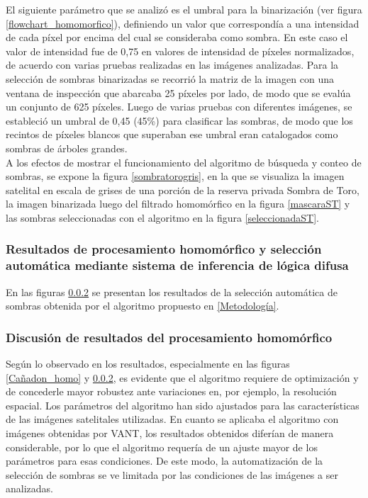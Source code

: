 El siguiente parámetro que se analizó es el umbral para la binarización (ver figura \ref{flowchart_homomorfico}), definiendo un valor que correspondía a una intensidad de cada píxel por encima del cual se consideraba como sombra. En este caso el valor de intensidad fue de 0,75 en valores de intensidad de píxeles normalizados, de acuerdo con varias pruebas realizadas en las imágenes analizadas.
Para la selección de sombras binarizadas se recorrió la matriz de la imagen con una ventana de inspección que abarcaba 25 píxeles por lado, de modo que se evalúa un conjunto de 625 píxeles. Luego de varias pruebas con diferentes imágenes, se estableció un umbral de 0,45 (45\%) para clasificar las sombras, de modo que los recintos de píxeles blancos que superaban ese umbral eran catalogados como sombras de árboles grandes.\\
A los efectos de mostrar el funcionamiento del algoritmo de búsqueda y conteo de sombras, se expone la figura \ref{sombratorogris}, en la que se visualiza la imagen satelital en escala de grises de una porción de la reserva privada Sombra de Toro, la imagen binarizada luego del filtrado homomórfico en la figura \ref{mascaraST} y las sombras seleccionadas con el algoritmo en la figura \ref{seleccionadaST}.


\subsubsection{Resultados de procesamiento homomórfico y selección automática mediante sistema de inferencia de lógica difusa}
En las figuras \ref{} se presentan los resultados de la selección automática de sombras obtenida por el algoritmo propuesto en \ref{Metodología}.

\subsubsection{Discusión de resultados del procesamiento homomórfico}
Según lo observado en los resultados, especialmente en las figuras \ref{Cañadon_homo} y \ref{}, es evidente que el algoritmo requiere de optimización y de concederle mayor robustez ante variaciones en, por ejemplo, la resolución espacial. Los parámetros del algoritmo han sido ajustados para las características de las imágenes satelitales utilizadas. En cuanto se aplicaba el algoritmo con imágenes obtenidas por VANT, los resultados obtenidos diferían de manera considerable, por lo que el algoritmo requería de un ajuste mayor de los parámetros para esas condiciones. De este modo, la automatización de la selección de sombras se ve limitada por las condiciones de las imágenes a ser analizadas.
